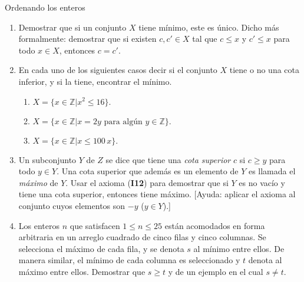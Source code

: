 \begin{section}{Ordenando los enteros}
\begin{enumerate}
\item Demostrar que si un conjunto $X$ tiene mínimo, este es único. Dicho más formalmente: demostrar que si existen $c,c' \in X$ tal que  $c\le x$ y $c'\le x$ para todo $x \in X$, entonces $c=c'$. 

\item En cada uno de los siguientes casos decir
si el conjunto $X$ tiene o no una cota inferior, y si la tiene,
encontrar el mínimo.

\begin{enumerate}
	\item $X = \{x \in \mathbb Z | x^2\le 16\}.$
	
	\item $X =\{x \in \mathbb Z | x=2y \text{\ para algún } y \in \mathbb Z\}.$
	
	\item $X =\{x \in \mathbb Z | x\le 100\,x\} .$
\end{enumerate}
\item Un subconjunto $Y$ de $Z$ se dice que tiene una {\em cota superior} $c$ si $c\ge y$ para todo $y \in Y$. 
Una cota superior que además es un elemento de $Y$ es llamada el {\em máximo} de
$Y$. Usar el axioma ({\bf I12}) para demostrar que si $Y$ es no vacío
y tiene una cota superior, entonces tiene máximo. [Ayuda: aplicar
el axioma al conjunto cuyos elementos son $-y$ ($y \in Y$).]

\item Los enteros $n$ que satisfacen $1 \le n \le 25$ están
acomodados en forma arbitraria en un arreglo cuadrado de cinco
filas y cinco columnas. Se selecciona el máximo
 de cada fila, y se denota $s$ al mínimo entre ellos.
De manera similar, el mínimo de cada columna es seleccionado y $t$
denota al máximo entre ellos. Demostrar que $s\ge t$ y de un
ejemplo en el cual $s\not=t$.
\end{enumerate}

\end{section}

